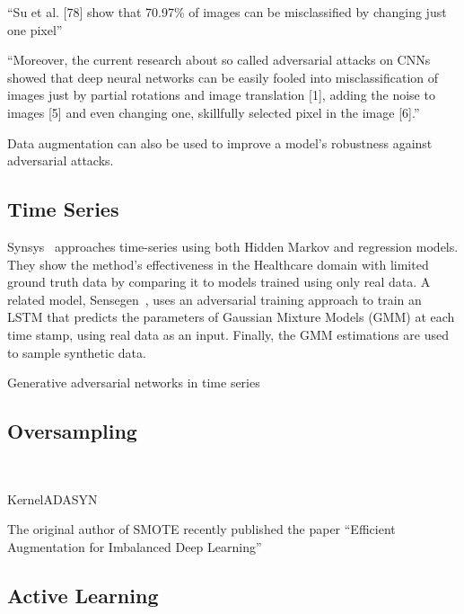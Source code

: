 \documentclass[parskip=full]{scrartcl}
\begin{document}
``Su et al. [78] show that 70.97\% of images can be misclassified by changing
just one pixel'' \citet{shorten2019survey}

``Moreover, the current research about so called adversarial attacks on CNNs
showed that deep neural networks can be easily fooled into misclassification
of images just by partial rotations and image translation [1], adding the
noise to images [5] and even changing one, skillfully selected pixel in the
image [6].'' \citet{mikolajczyk2018data}

Data augmentation can also be used to improve a model's robustness against
adversarial attacks. 



\subsection{Time Series}


Synsys~\cite{dahmen2019synsys} approaches time-series using both Hidden Markov
and regression models. They show the method's effectiveness in the Healthcare
domain with limited ground truth data by comparing it to models trained using
only real data. A related model, Sensegen~\cite{alzantot2017sensegen}, uses an
adversarial training approach to train an LSTM that predicts the parameters
of Gaussian Mixture Models (GMM) at each time stamp, using real data as
an input. Finally, the GMM estimations are used to sample synthetic data. 


Generative adversarial networks in time series 


\subsection{Oversampling}~\label{sec:oversampling}

KernelADASYN~\cite{tang2015kerneladasyn}

The original author of SMOTE recently published the paper ``Efficient Augmentation for Imbalanced Deep
Learning''~\cite{dablain2022efficient}

\subsection{Active Learning}~\label{sec:active-learning}
\end{document}
